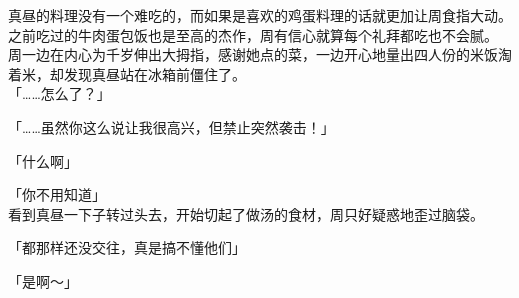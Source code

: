 真昼的料理没有一个难吃的，而如果是喜欢的鸡蛋料理的话就更加让周食指大动。之前吃过的牛肉蛋包饭也是至高的杰作，周有信心就算每个礼拜都吃也不会腻。\\

周一边在内心为千岁伸出大拇指，感谢她点的菜，一边开心地量出四人份的米饭淘着米，却发现真昼站在冰箱前僵住了。\\

「……怎么了？」

「……虽然你这么说让我很高兴，但禁止突然袭击！」

「什么啊」

「你不用知道」\\

看到真昼一下子转过头去，开始切起了做汤的食材，周只好疑惑地歪过脑袋。\\

\vspace{2\baselineskip}

「都那样还没交往，真是搞不懂他们」

「是啊～」
